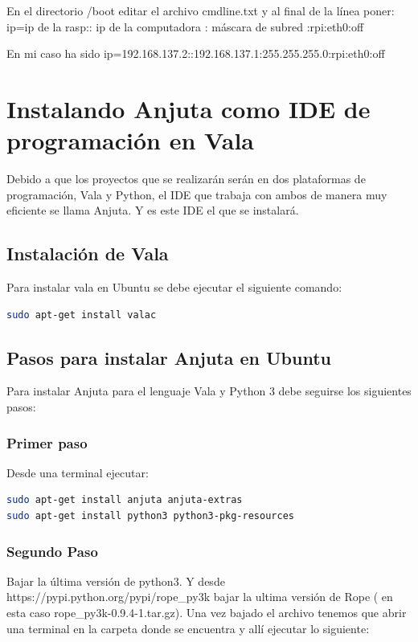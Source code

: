 \documentclass[12pt,twoside]{book}
\begin{document}
En el directorio /boot editar el archivo cmdline.txt y al final de la línea poner:
ip=ip de la rasp:: ip de la computadora : máscara de subred :rpi:eth0:off

En mi caso ha sido
ip=192.168.137.2::192.168.137.1:255.255.255.0:rpi:eth0:off


\section{Instalando Anjuta como IDE de programación en Vala}

Debido a que los proyectos que se realizarán serán en dos plataformas de programación, Vala y Python, el IDE que trabaja con ambos de manera muy eficiente se llama Anjuta. Y es este IDE el que se instalará. 

\subsection{Instalación de Vala}

Para instalar vala en Ubuntu se debe ejecutar el siguiente comando:

\begin{lstlisting}[language=bash]
sudo apt-get install valac
\end{lstlisting}

\subsection{Pasos para instalar Anjuta en Ubuntu}

Para instalar Anjuta para el lenguaje Vala y Python 3 debe seguirse los siguientes pasos:

\subsubsection{Primer paso}
Desde una terminal ejecutar:
\begin{lstlisting}[language=bash]
sudo apt-get install anjuta anjuta-extras 
sudo apt-get install python3 python3-pkg-resources
\end{lstlisting}

\subsubsection{Segundo Paso}

Bajar la última versión de python3. Y desde https://pypi.python.org/pypi/rope\_py3k bajar la ultima versión de Rope ( en esta caso rope\_py3k-0.9.4-1.tar.gz). Una vez bajado el archivo tenemos que abrir una terminal en la carpeta donde se encuentra y allí ejecutar lo siguiente:
\end{document}
